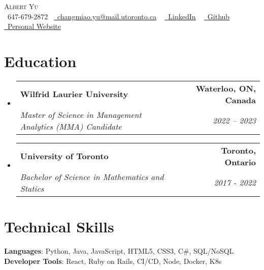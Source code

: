 \documentclass[letterpaper,11pt]{article}
\makeatletter
\newcommand{\resumeSubheading}[4]{
  \vspace{-2pt}\item
    \begin{tabular*}{1.0\textwidth}[t]{l@{\extracolsep{\fill}}r}
      \textbf{#1} & \textbf{\small #2} \\
      \textit{\small#3} & \textit{\small #4} \\
    \end{tabular*}\vspace{-7pt}
}
\newcommand{\resumeSubHeadingListStart}{\begin{itemize}[leftmargin=0.0in, label={}]}
\newcommand{\resumeSubHeadingListEnd}{\end{itemize}}
\makeatother
\begin{document}
\begin{center}
    {\Huge \scshape Albert Yu} \\ \vspace{1pt}
    \small \raisebox{-0.1\height}\faPhone\ 647-679-2872~ \href{changmiao.yu@mail.utoronto.ca}{\raisebox{-0.2\height}\faEnvelope\  \underline{changmiao.yu@mail.utoronto.ca}} ~ 
    \href{www.linkedin.com/in/albert-changmiao-yu}{\raisebox{-0.2\height}\faLinkedin\ \underline{LinkedIn}}  ~
    \href{https://github.com/AlbertYu97}{\raisebox{-0.2\height}\faGithub\ \underline{Github}}
    \href{https://albertyu97.github.io/Albert_Website_Design/}{\raisebox{-0.2\height}\faWeb\ \underline{Personal Website}}
    \vspace{-8pt}
\end{center}


\section{Education}
  \resumeSubHeadingListStart
    \resumeSubheading
      {Wilfrid Laurier University}{Waterloo, ON, Canada}
      {Master of Science in Management Analytics (MMA) Candidate}{2022 – 2023}
    \resumeSubheading
      {University of Toronto}{Toronto, Ontario}
      {Bachelor of Science in Mathematics and Statics}{2017 - 2022}

  \resumeSubHeadingListEnd

  

%
\section{Technical Skills}
  \begin{itemize}[leftmargin=0.15in, label={}]
    \small{\item{
      \textbf{Languages}{: Python, Java, JavaScript, HTML5, CSS3, C#, SQL/NoSQL} \\
      \textbf{Developer Tools}{: React, Ruby on Rails, CI/CD, Node, Docker, K8s} \\
    }}
  \end{itemize}
\vspace{-16pt}

\end{document}
